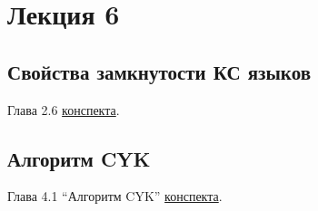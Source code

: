 \section{Лекция 6}

\subsection{Свойства замкнутости КС языков}

Глава 2.6 \href{https://github.com/YaccConstructor/articles/blob/master/InProgress/Formal_langs_CFPQ_course_notes/Formal_lang_CFPQ_course_notes.pdf}{конспекта}.

\subsection{Алгоритм CYK}

Глава 4.1 ``Алгоритм CYK'' \href{https://github.com/YaccConstructor/articles/blob/master/InProgress/Formal_langs_CFPQ_course_notes/Formal_lang_CFPQ_course_notes.pdf}{конспекта}.

